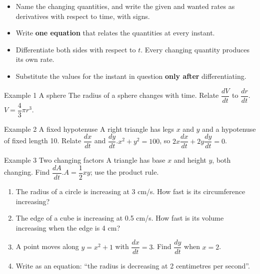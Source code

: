 \documentclass[11pt]{article}
\begin{document}

\begin{ideabox}
\begin{itemize}[leftmargin=*,itemsep=2pt,topsep=2pt]
  \item Name the changing quantities, and write the given and wanted rates as derivatives with respect to time, with signs.
  \item Write \textbf{one equation} that relates the quantities at every instant.
  \item Differentiate both sides with respect to $t$. Every changing quantity produces its own rate.
  \item Substitute the values for the instant in question \textbf{only after} differentiating.
\end{itemize}
\end{ideabox}

\begin{example}{Example 1 \textperiodcentered{} A sphere}
The radius of a sphere changes with time. Relate $\dfrac{dV}{dt}$ to $\dfrac{dr}{dt}$.\soln $V=\dfrac43\pi r^3$.
\end{example}

\begin{example}{Example 2 \textperiodcentered{} A fixed hypotenuse}
A right triangle has legs $x$ and $y$ and a hypotenuse of fixed length 10. Relate $\dfrac{dx}{dt}$ and $\dfrac{dy}{dt}$.\soln $x^2+y^2=100$, so $2x\dfrac{dx}{dt}+2y\dfrac{dy}{dt}=0$.
\end{example}

\begin{example}{Example 3 \textperiodcentered{} Two changing factors}
A triangle has base $x$ and height $y$, both changing. Find $\dfrac{dA}{dt}$.\soln $A=\dfrac12xy$; use the product rule.
\end{example}

\newpage
{}

\begin{enumerate}[leftmargin=*,itemsep=2pt]
  \item The radius of a circle is increasing at 3 cm/s. How fast is its circumference increasing?\work{2.3cm}
  \item The edge of a cube is increasing at 0.5 cm/s. How fast is its volume increasing when the edge is 4 cm?\work{2.3cm}
  \item A point moves along $y=x^2+1$ with $\dfrac{dx}{dt}=3$. Find $\dfrac{dy}{dt}$ when $x=2$.\work{2.3cm}
  \item Write as an equation: \textquotedblleft{}the radius is decreasing at 2 centimetres per second\textquotedblright{}.\work{2.3cm}
\end{enumerate}
\end{document}

